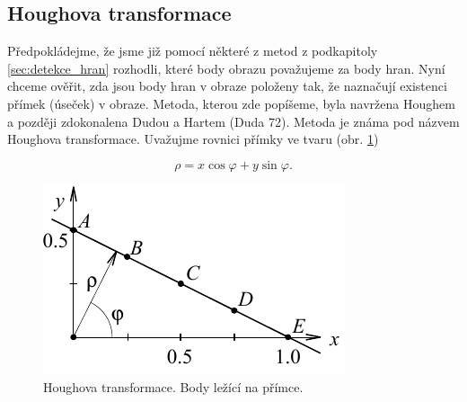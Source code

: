 








\subsection*{Houghova transformace}

Předpokládejme, že jsme již pomocí některé z metod z podkapitoly \ref{sec:detekce_hran} rozhodli, které body obrazu považujeme za body hran. Nyní chceme ověřit, zda jsou body hran v obraze položeny tak, že naznačují existenci přímek (úseček) v obraze. Metoda, kterou zde popíšeme, byla navržena Houghem a později zdokonalena Dudou a Hartem (Duda 72). Metoda je známa pod názvem Houghova transformace. Uvažujme rovnici přímky ve tvaru (obr. \ref{img:8_19})

\begin{equation} \label{eq:8_67}
    \rho = x\cos \varphi + y\sin \varphi .
\end{equation}

\begin{figure}[th]
    \begin{center}
        \includegraphics[scale=0.9]{08_segmentace/images/img_8_19.pdf}
    \end{center}
    \caption{Houghova transformace. Body ležící na přímce.}
    \label{img:8_19}
\end{figure}

